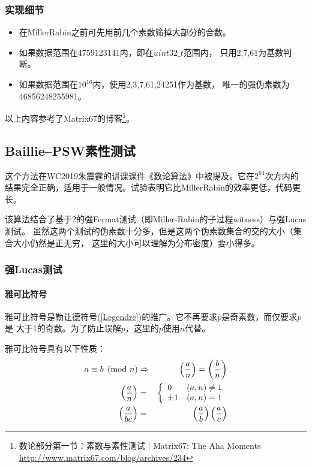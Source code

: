 \subsubsection{实现细节}
\begin{itemize}
    \item 在MillerRabin之前可先用前几个素数筛掉大部分的合数。
    \item 如果数据范围在4759123141内，即在$uint32\_t$范围内，
    只用2,7,61为基数判断。
    \item 如果数据范围在$10^{16}$内，使用2,3,7,61,24251作为基数，
    唯一的强伪素数为46856248255981。
\end{itemize}

以上内容参考了Matrix67的博客\footnote{
	数论部分第一节：素数与素性测试 | Matrix67: The Aha Moments
	\url{http://www.matrix67.com/blog/archives/234}}。
\subsection{Baillie–PSW素性测试}
这个方法在WC2019朱震霆的讲课课件《数论算法》中被提及。它在$2^64$次方内的
结果完全正确，适用于一般情况。试验表明它比MillerRabin的效率更低，代码更长。

该算法结合了基于2的强Fermat测试（即Miller-Rabin的子过程witness）与强Lucas测试。
虽然这两个测试的伪素数十分多，但是这两个伪素数集合的交的大小（集合大小仍然是正无穷，
这里的大小可以理解为分布密度）要小得多。

\subsubsection{强Lucas测试}
\paragraph{雅可比符号}
雅可比符号是勒让德符号(\ref{Legendre})的推广。它不再要求$p$是奇素数，而仅要求$p$是
大于1的奇数。为了防止误解$p$，这里的$p$使用$n$代替。

雅可比符号具有以下性质：
\begin{eqnarray}
    a\equiv b\pmod{n}&\Rightarrow& \left(\frac{a}{n}\right)=\left(\frac{b}{n}\right)\label{JSR1}\\
    \left(\frac{a}{n}\right)&=&\left\{
    \begin{array}{lr}
        0&(a,n)\neq 1\\
        \pm 1&(a,n)=1
    \end{array}
    \right.\label{JSR2}\\
    \left(\frac{a}{bc}\right)&=&\left(\frac{a}{b}\right)\left(\frac{a}{c}\right)\label{JSR3}\\
\end{eqnarray}


